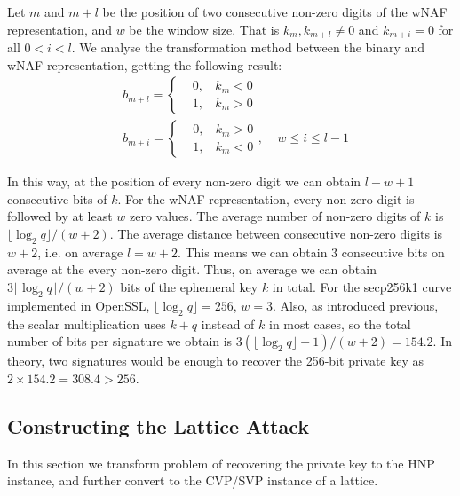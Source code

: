  Let $m$ and $m + l$ be the position of two consecutive non-zero digits of the wNAF representation, and $w$ be the window size.
 That is $k_m, k_{m+l} \neq 0$ and $k_{m+i} = 0$ for all $0 < i < l$.
 We analyse the transformation method between the binary and wNAF representation, getting the following result:
 \begin{align}
 &b_{m+l} = \left\{
 \begin{aligned}
 	&0,\,\;\ \   k_m < 0 \\
 	&1,\,\;\ \   k_m > 0
 \end{aligned}
 \right.   \\
 &b_{m+i} = \left\{
 \begin{aligned}
 	&0,\,\;\ \   k_m > 0 \\
 	&1,\,\;\ \   k_m < 0
 \end{aligned}
 \right.
 ,\ \ \ \ \  w \leq i \leq l-1
 \end{align}

In this way, at the position of every non-zero digit we can obtain $l - w + 1$ consecutive bits of $k$.
For the wNAF representation, every non-zero digit is followed by at least $w$ zero values. 
 The average number of non-zero digits of $k$ is $\lfloor\log_{2}{q}\rfloor /(w+2)$.
 The average distance between consecutive non-zero digits is $w+2$, i.e. on average $l = w + 2$.
 This means we can obtain $3$ consecutive bits on average at the every non-zero digit.
Thus, on average we can obtain $3\lfloor\log_{2}{q}\rfloor /(w+2)$ bits of the ephemeral key $k$ in total.
For the secp256k1 curve implemented in OpenSSL, $\lfloor\log_{2}{q}\rfloor = 256$, $w = 3$.
 Also, as introduced previous, the scalar multiplication uses $k+q$ instead of $k$ in most cases,
  so the total number of bits per signature we obtain is $3(\lfloor\log_{2}{q}\rfloor +1)/(w+2) = 154.2$.
In theory, two signatures would be enough to recover the 256-bit private key as $2\times 154.2 = 308.4 > 256$. 


%


\subsection{Constructing the Lattice Attack}
\label{data_proc2}
In this section we transform problem of recovering the private key to the HNP instance, and further convert to the CVP/SVP instance of a lattice.

